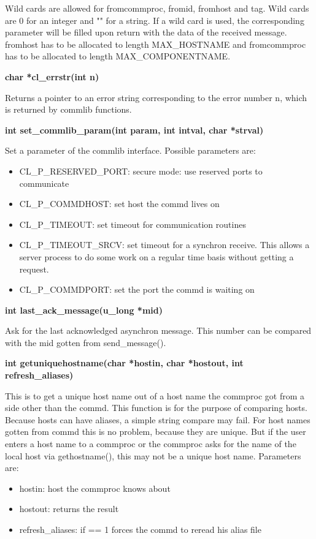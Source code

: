 Wild cards are allowed for fromcommproc, fromid, fromhost and tag.
Wild cards are 0 for an integer and "" for a string. If a wild card is used,
the corresponding parameter will be filled upon return with the data of 
the received message. fromhost has to be allocated to length MAX\_HOSTNAME
and fromcommproc has to be allocated to length MAX\_COMPONENTNAME.
\bigskip

{\bf char *cl\_errstr(int n)}
\bigskip

Returns a pointer to an error string corresponding to the error number
n, which is returned by commlib functions.
\bigskip


{\bf int set\_commlib\_param(int param, int intval, char *strval)}
\bigskip

Set a parameter of the commlib interface. Possible parameters are:

\begin{itemize}
\item CL\_P\_RESERVED\_PORT: secure mode: use reserved ports to communicate
\item CL\_P\_COMMDHOST: set host the commd lives on
\item CL\_P\_TIMEOUT: set timeout for communication routines
\item CL\_P\_TIMEOUT\_SRCV: set timeout for a synchron receive. This allows a 
server process to do some work on a regular time basis without getting a 
request.
\item CL\_P\_COMMDPORT: set the port the commd is waiting on
\end{itemize} 
\bigskip

{\bf int last\_ack\_message(u\_long *mid)} 
\bigskip

Ask for the last acknowledged asynchron message. This number can be compared 
with the mid gotten from send\_message().
\bigskip

{\bf int getuniquehostname(char *hostin, char *hostout, int refresh\_aliases)}
\bigskip

This is to get a unique host name out of a host name the commproc got from a side
other than the commd. This function is for the purpose of comparing hosts.
Because hosts can have aliases, a simple string compare may fail. For host names
gotten from commd this is no problem, because they are unique. But if the user
enters a host name to a commproc or the commproc asks for the name of
the local host via gethostname(), this may not be a unique host name.
Parameters are:
\begin{itemize}
\item hostin: host the commproc knows about
\item hostout: returns the result
\item refresh\_aliases: if == 1 forces the commd to reread his alias file
\end{itemize}
\bigskip


